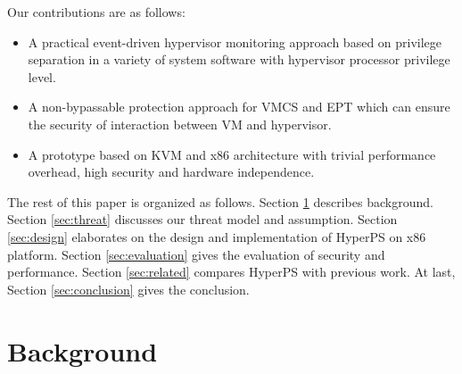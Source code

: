 \documentclass[conference]{IEEEtran}
\begin{document}
Our contributions are as follows:
\begin{itemize}



\item{A practical event-driven hypervisor monitoring approach based on privilege separation in a variety of system software with hypervisor processor privilege level.}%
\item{A non-bypassable protection approach for VMCS and EPT which can ensure the security of interaction between VM and hypervisor.}
\item{A prototype based on KVM and x86 architecture with trivial performance overhead, high security and hardware independence.}%
\end{itemize}

The rest of this paper is organized as follows. Section \ref{background} describes background. Section \ref{sec:threat} discusses our threat model and assumption. Section \ref{sec:design} elaborates on the design and implementation of HyperPS on x86 platform. Section \ref{sec:evaluation} gives the evaluation of security and performance. Section \ref{sec:related} compares HyperPS with previous work. At last, Section \ref{sec:conclusion} gives the conclusion.

%
%
%
%
%


\section{Background}\label{background}
\end{document}
